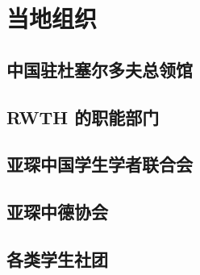 \chapter{当地组织}

\section{中国驻杜塞尔多夫总领馆}


\section{RWTH 的职能部门}

\section{亚琛中国学生学者联合会}

\section{亚琛中德协会}

\section{各类学生社团}

